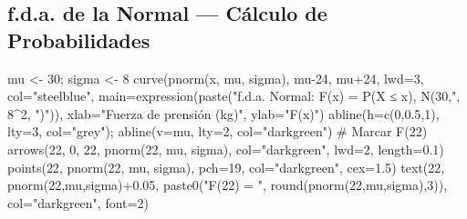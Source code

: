 \documentclass[
  letterpaper,
  DIV=11,
  numbers=noendperiod]{scrartcl}
\newenvironment{Shaded}{\begin{snugshade}}{\end{snugshade}}
\newcommand{\AttributeTok}[1]{\textcolor[rgb]{0.40,0.45,0.13}{#1}}
\newcommand{\CommentTok}[1]{\textcolor[rgb]{0.37,0.37,0.37}{#1}}
\newcommand{\DecValTok}[1]{\textcolor[rgb]{0.68,0.00,0.00}{#1}}
\newcommand{\FloatTok}[1]{\textcolor[rgb]{0.68,0.00,0.00}{#1}}
\newcommand{\FunctionTok}[1]{\textcolor[rgb]{0.28,0.35,0.67}{#1}}
\newcommand{\NormalTok}[1]{\textcolor[rgb]{0.00,0.23,0.31}{#1}}
\newcommand{\OtherTok}[1]{\textcolor[rgb]{0.00,0.23,0.31}{#1}}
\newcommand{\SpecialCharTok}[1]{\textcolor[rgb]{0.37,0.37,0.37}{#1}}
\newcommand{\StringTok}[1]{\textcolor[rgb]{0.13,0.47,0.30}{#1}}
\begin{document}
\subsection{f.d.a. de la Normal --- Cálculo de
Probabilidades}\label{f.d.a.-de-la-normal-calculo-de-probabilidades}

\begin{Shaded}
\begin{Highlighting}[]
\NormalTok{mu }\OtherTok{\textless{}{-}} \DecValTok{30}\NormalTok{; sigma }\OtherTok{\textless{}{-}} \DecValTok{8}
\FunctionTok{curve}\NormalTok{(}\FunctionTok{pnorm}\NormalTok{(x, mu, sigma), mu}\DecValTok{{-}24}\NormalTok{, mu}\SpecialCharTok{+}\DecValTok{24}\NormalTok{, }\AttributeTok{lwd=}\DecValTok{3}\NormalTok{, }\AttributeTok{col=}\StringTok{"steelblue"}\NormalTok{,}
      \AttributeTok{main=}\FunctionTok{expression}\NormalTok{(}\FunctionTok{paste}\NormalTok{(}\StringTok{"f.d.a. Normal: F(x) = P(X ≤ x),  N(30,"}\NormalTok{, }\DecValTok{8}\SpecialCharTok{\^{}}\DecValTok{2}\NormalTok{, }\StringTok{")"}\NormalTok{)),}
      \AttributeTok{xlab=}\StringTok{"Fuerza de prensión (kg)"}\NormalTok{, }\AttributeTok{ylab=}\StringTok{"F(x)"}\NormalTok{)}
\FunctionTok{abline}\NormalTok{(}\AttributeTok{h=}\FunctionTok{c}\NormalTok{(}\DecValTok{0}\NormalTok{,}\FloatTok{0.5}\NormalTok{,}\DecValTok{1}\NormalTok{), }\AttributeTok{lty=}\DecValTok{3}\NormalTok{, }\AttributeTok{col=}\StringTok{"grey"}\NormalTok{); }\FunctionTok{abline}\NormalTok{(}\AttributeTok{v=}\NormalTok{mu, }\AttributeTok{lty=}\DecValTok{2}\NormalTok{, }\AttributeTok{col=}\StringTok{"darkgreen"}\NormalTok{)}
\CommentTok{\# Marcar F(22)}
\FunctionTok{arrows}\NormalTok{(}\DecValTok{22}\NormalTok{, }\DecValTok{0}\NormalTok{, }\DecValTok{22}\NormalTok{, }\FunctionTok{pnorm}\NormalTok{(}\DecValTok{22}\NormalTok{, mu, sigma), }\AttributeTok{col=}\StringTok{"darkgreen"}\NormalTok{, }\AttributeTok{lwd=}\DecValTok{2}\NormalTok{, }\AttributeTok{length=}\FloatTok{0.1}\NormalTok{)}
\FunctionTok{points}\NormalTok{(}\DecValTok{22}\NormalTok{, }\FunctionTok{pnorm}\NormalTok{(}\DecValTok{22}\NormalTok{, mu, sigma), }\AttributeTok{pch=}\DecValTok{19}\NormalTok{, }\AttributeTok{col=}\StringTok{"darkgreen"}\NormalTok{, }\AttributeTok{cex=}\FloatTok{1.5}\NormalTok{)}
\FunctionTok{text}\NormalTok{(}\DecValTok{22}\NormalTok{, }\FunctionTok{pnorm}\NormalTok{(}\DecValTok{22}\NormalTok{,mu,sigma)}\SpecialCharTok{+}\FloatTok{0.05}\NormalTok{, }\FunctionTok{paste0}\NormalTok{(}\StringTok{"F(22) = "}\NormalTok{, }\FunctionTok{round}\NormalTok{(}\FunctionTok{pnorm}\NormalTok{(}\DecValTok{22}\NormalTok{,mu,sigma),}\DecValTok{3}\NormalTok{)), }\AttributeTok{col=}\StringTok{"darkgreen"}\NormalTok{, }\AttributeTok{font=}\DecValTok{2}\NormalTok{)}
\end{Highlighting}
\end{Shaded}
\end{document}
